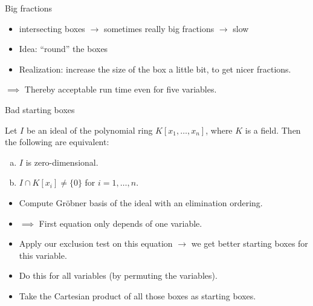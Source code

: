 \documentclass[german,10pt,xcolor=colortbl,compress,handout]{beamer}
\begin{document}
\begin{frame}{Big fractions}
    \begin{itemize}
        \pause
        \item intersecting boxes $\rightarrow$ sometimes really big fractions $\rightarrow$ slow
        \pause
        \item Idea: \enquote{round} the boxes
        \pause
        \item Realization: increase the size of the box a little bit, to get nicer fractions.
    \end{itemize}
    \bigskip
    \pause

    \begin{center}
    \end{center}
    \pause

    $\implies$ Thereby acceptable run time even for five variables.
\end{frame}

\begin{frame}{Bad starting boxes}
    \pause
    \begin{lemma}
        Let $I$ be an ideal of the polynomial ring $K[x_1, \hdots, x_n]$, where $K$ is a
        field. Then the following are equivalent:
        \begin{enumerate}[a)]
            \item $I$ is zero-dimensional.
            \item $I \cap K[x_i] \neq \{0\}$ for $i=1,\hdots, n$.
        \end{enumerate}
        \pause
    \end{lemma}

    \begin{itemize}
        \item Compute Gröbner basis of the ideal with an elimination ordering.
        \pause
        \item[] $\implies$ First equation only depends of one variable.
        \pause
        \item Apply our exclusion test on this equation $\rightarrow$ we get better
            starting boxes for this variable.
        \item Do this for all variables (by permuting the variables).
        \item Take the Cartesian product of all those boxes as starting boxes.
    \end{itemize}
\end{frame}
\end{document}
